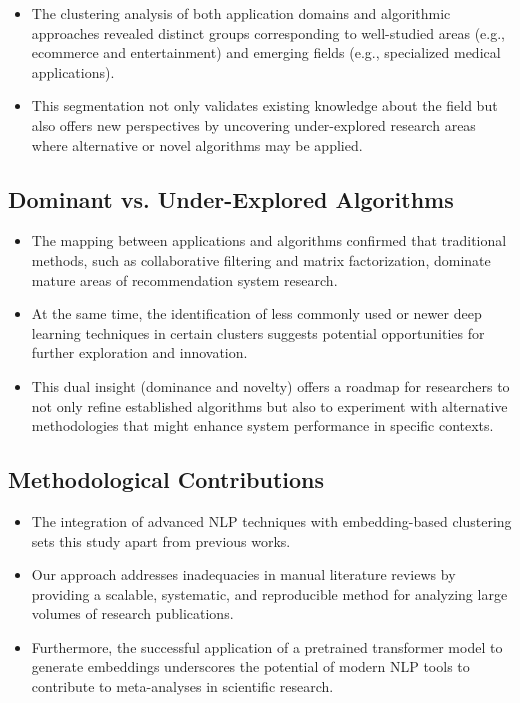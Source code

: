 \documentclass[
	a4paper, %
	10pt, %
	unnumberedsections, %
	twoside, %
]{LTJournalArticle}
\begin{document}
\begin{itemize}
    \item The clustering analysis of both application domains and algorithmic approaches revealed distinct groups corresponding to well-studied areas (e.g., ecommerce and entertainment) and emerging fields (e.g., specialized medical applications).    
    \item This segmentation not only validates existing knowledge about the field but also offers new perspectives by uncovering under-explored research areas where alternative or novel algorithms may be applied.
\end{itemize}

\subsection{Dominant vs. Under-Explored Algorithms}

\begin{itemize}
    \item The mapping between applications and algorithms confirmed that traditional methods, such as collaborative filtering and matrix factorization, dominate mature areas of recommendation system research.    
    \item At the same time, the identification of less commonly used or newer deep learning techniques in certain clusters suggests potential opportunities for further exploration and innovation.    
    \item This dual insight (dominance and novelty) offers a roadmap for researchers to not only refine established algorithms but also to experiment with alternative methodologies that might enhance system performance in specific contexts.
\end{itemize}

\subsection{Methodological Contributions}

\begin{itemize}
    \item The integration of advanced NLP techniques with embedding-based clustering sets this study apart from previous works.    
    \item Our approach addresses inadequacies in manual literature reviews by providing a scalable, systematic, and reproducible method for analyzing large volumes of research publications.  
    \item Furthermore, the successful application of a pretrained transformer model to generate embeddings underscores the potential of modern NLP tools to contribute to meta-analyses in scientific research.
\end{itemize}
\end{document}
